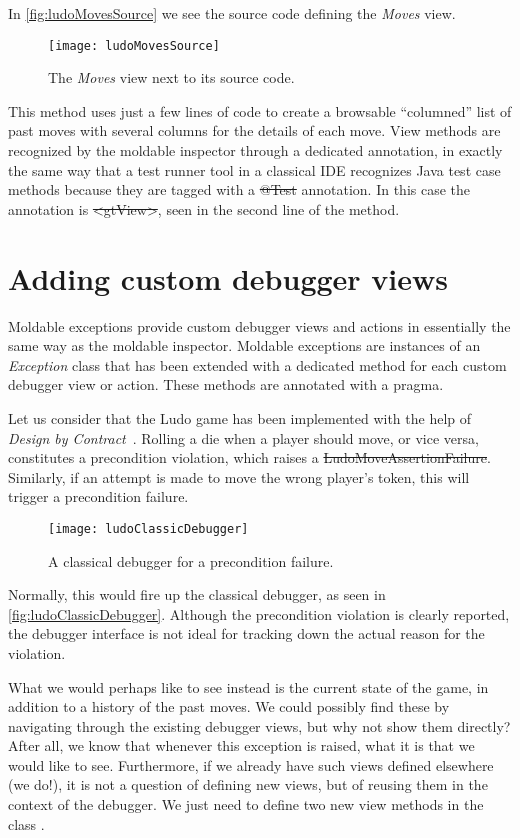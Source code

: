 \documentclass[sigplan,anonymous,review,10pt]{acmart}
\newcommand\lmaf{\lst{Ludo\-Move\-Assert\-ion\-Fail\-ure}\xspace}
\begin{document}
In \autoref{fig:ludoMovesSource} we see the source code defining the \emph{Moves} view.
\begin{figure}[h]
  \texttt{[image: ludoMovesSource]}
  \caption{The \emph{Moves} view next to its source code.}
  \label{fig:ludoMovesSource}
\end{figure}
This method uses just a few lines of code to create a browsable ``columned'' list of past moves with several columns for the details of each move.
View methods are recognized by the moldable inspector through a dedicated annotation, in exactly the same way that a test runner tool in a classical IDE recognizes Java test case methods because they are tagged with a \st{@Test} annotation.
In this case the annotation is \st{<gtView>}, seen in the second line of the method.

\section{Adding custom debugger views}\label{sec:views}

Moldable exceptions provide custom debugger views and actions in essentially the same way as the moldable inspector.
Moldable exceptions are instances of an \emph{Exception} class that has been extended with a dedicated method for each custom debugger view or action.
These methods are annotated with a  pragma.

Let us consider that the Ludo game has been implemented with the help of \emph{Design by Contract}~\cite{Meye92b}.
Rolling a die when a player should move, or vice versa, constitutes a precondition violation, which raises a \st{LudoMoveAssertionFailure}.
Similarly, if an attempt is made to move the wrong player's token, this will trigger a precondition failure.
\begin{figure}[h]
  \texttt{[image: ludoClassicDebugger]}
  \caption{A classical debugger for a precondition failure.}
  \label{fig:ludoClassicDebugger}
\end{figure}
Normally, this would fire up the classical debugger, as seen in \autoref{fig:ludoClassicDebugger}.
Although the precondition violation is clearly reported, the debugger interface is not ideal for tracking down the actual reason for the violation.

What we would perhaps like to see instead is the current state of the game, in addition to a history of the past moves.
We could possibly find these by navigating through the existing debugger views, but why not show them directly?
After all, we know that whenever this exception is raised, what it is that we would like to see.
Furthermore, if we already have such views defined elsewhere (we do!), it is not a question of defining new views, but of reusing them in the context of the debugger.
We just need to define two new view methods in the class \lmaf.
\end{document}
